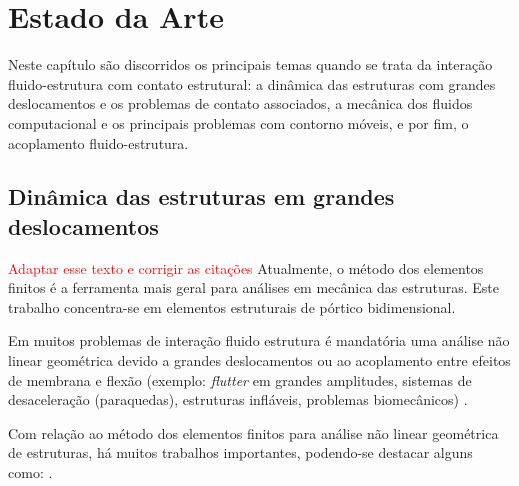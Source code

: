 \documentclass[_ArquivoPrincipal.tex]{subfiles}
\begin{document}
    
    












\chapter{Estado da Arte}
	Neste capítulo são discorridos os principais temas quando se trata da interação fluido-estrutura com contato estrutural: a dinâmica das estruturas com grandes deslocamentos e os problemas de contato associados, a mecânica dos fluidos computacional e os principais problemas com contorno móveis, e por fim, o acoplamento fluido-estrutura.

\section{Dinâmica das estruturas em grandes deslocamentos}

\textcolor{red}{Adaptar esse texto e corrigir as citações}
Atualmente, o método dos elementos finitos é a ferramenta mais geral para análises em mecânica das estruturas. Este trabalho concentra-se em elementos estruturais de pórtico bidimensional.

Em muitos problemas de interação fluido estrutura é mandatória uma análise não linear geométrica devido a grandes deslocamentos ou ao acoplamento entre efeitos de membrana e flexão (exemplo: \textit{flutter} em grandes amplitudes, sistemas de desaceleração (paraquedas), estruturas infláveis, problemas biomecânicos) \cite{SanchesC:2014}.

Com relação ao método dos elementos finitos para análise não linear geométrica de estruturas, há muitos trabalhos importantes, podendo-se destacar alguns como: \cite{HughesC:1983, HughesL:1981a,BrendelR:1980}.
\end{document}
